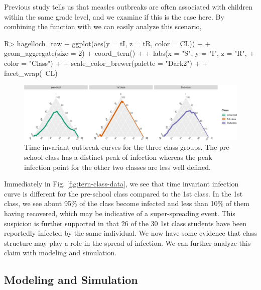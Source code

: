 \documentclass[
  shortnames]{jss}
\begin{document}
Previous study tells us that measles outbreaks are often associated with
children within the same grade level, and we examine if this is the case
here. By combining the function  with
 we can easily analyze this scenario,

\begin{CodeChunk}
\begin{CodeInput}
R> hagelloch_raw %
+   ggplot(aes(y = tI, z = tR, color = CL)) +
+   geom_aggregate(size = 2) + coord_tern() +
+   labs(x = "S", y = "I", z = "R",
+        color = "Class") +
+   scale_color_brewer(palette = "Dark2") +
+   facet_wrap(~CL)
\end{CodeInput}
\begin{figure}[H]

{\centering \includegraphics{Figs/unnamed-chunk-5-1} 

}

\caption{\label{fig:tern-class-data}Time invariant outbreak curves for the three class groups.  The pre-school class has a distinct peak of infection whereas the peak infection point for the other two classes are less well defined.}\label{fig:unnamed-chunk-5}
\end{figure}
\end{CodeChunk}

Immediately in Fig. \ref{fig:tern-class-data}, we see that time
invariant infection curve is different for the pre-school class compared
to the 1st class. In the 1st class, we see about 95\% of the class
become infected and less than 10\% of them having recovered, which may
be indicative of a super-spreading event. This suspicion is further
supported in that 26 of the 30 1st class students have been reportedly
infected by the same individual. We now have some evidence that class
structure may play a role in the spread of infection. We can further
analyze this claim with modeling and simulation.

\hypertarget{modeling-and-simulation}{%
\subsection{Modeling and Simulation}\label{modeling-and-simulation}}
\end{document}
